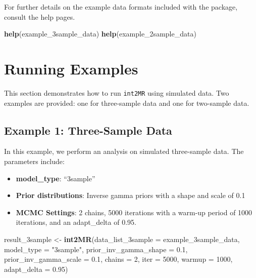 \documentclass[
]{article}
\newenvironment{Shaded}{\begin{snugshade}}{\end{snugshade}}
\newcommand{\AttributeTok}[1]{\textcolor[rgb]{0.13,0.29,0.53}{#1}}
\newcommand{\DecValTok}[1]{\textcolor[rgb]{0.00,0.00,0.81}{#1}}
\newcommand{\FloatTok}[1]{\textcolor[rgb]{0.00,0.00,0.81}{#1}}
\newcommand{\FunctionTok}[1]{\textcolor[rgb]{0.13,0.29,0.53}{\textbf{#1}}}
\newcommand{\NormalTok}[1]{#1}
\newcommand{\OtherTok}[1]{\textcolor[rgb]{0.56,0.35,0.01}{#1}}
\newcommand{\StringTok}[1]{\textcolor[rgb]{0.31,0.60,0.02}{#1}}
\providecommand{\tightlist}{%
  \setlength{\itemsep}{0pt}\setlength{\parskip}{0pt}}
\begin{document}
For further details on the example data formats included with the
package, consult the help pages.

\begin{Shaded}
\begin{Highlighting}[]
\FunctionTok{help}\NormalTok{(example\_3sample\_data)}
\FunctionTok{help}\NormalTok{(example\_2sample\_data)}
\end{Highlighting}
\end{Shaded}

\section{Running Examples}\label{running-examples}

This section demonstrates how to run \texttt{int2MR} using simulated
data. Two examples are provided: one for three-sample data and one for
two-sample data.

\subsection{Example 1: Three-Sample
Data}\label{example-1-three-sample-data}

In this example, we perform an analysis on simulated three-sample data.
The parameters include:

\begin{itemize}
\tightlist
\item
  \textbf{model\_type}: ``3sample''
\item
  \textbf{Prior distributions}: Inverse gamma priors with a shape and
  scale of 0.1
\item
  \textbf{MCMC Settings}: 2 chains, 5000 iterations with a warm-up
  period of 1000 iterations, and an adapt\_delta of 0.95.
\end{itemize}

\begin{Shaded}
\begin{Highlighting}[]
\NormalTok{result\_3sample }\OtherTok{\textless{}{-}} \FunctionTok{int2MR}\NormalTok{(}\AttributeTok{data\_list\_3sample =}\NormalTok{ example\_3sample\_data,}
                 \AttributeTok{model\_type =} \StringTok{"3sample"}\NormalTok{,}
                 \AttributeTok{prior\_inv\_gamma\_shape =} \FloatTok{0.1}\NormalTok{,}
                 \AttributeTok{prior\_inv\_gamma\_scale =} \FloatTok{0.1}\NormalTok{,}
                 \AttributeTok{chains =} \DecValTok{2}\NormalTok{, }\AttributeTok{iter =} \DecValTok{5000}\NormalTok{, }\AttributeTok{warmup =} \DecValTok{1000}\NormalTok{,}
                 \AttributeTok{adapt\_delta =} \FloatTok{0.95}\NormalTok{)}
\end{Highlighting}
\end{Shaded}
\end{document}
